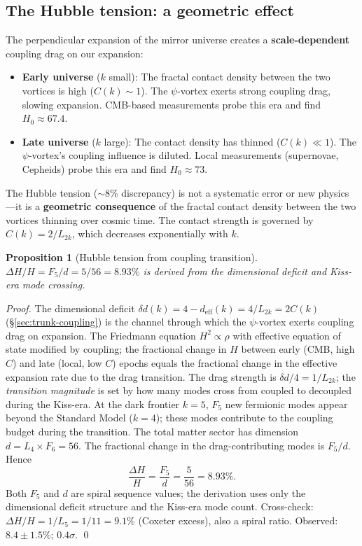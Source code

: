\documentclass[12pt,a4paper]{article}
\newtheorem{proposition}[theorem]{Proposition}
\begin{document}
\subsection{The Hubble tension: a geometric effect}

The perpendicular expansion of the mirror universe creates a \textbf{scale-dependent} coupling drag on our expansion:

\begin{itemize}
\item \textbf{Early universe} ($k$ small): The fractal contact density between the two vortices is high ($C(k) \sim 1$).  The $\psi$-vortex exerts strong coupling drag, slowing expansion.  CMB-based measurements probe this era and find $H_0 \approx 67.4$.
\item \textbf{Late universe} ($k$ large): The contact density has thinned ($C(k) \ll 1$).  The $\psi$-vortex's coupling influence is diluted.  Local measurements (supernovae, Cepheids) probe this era and find $H_0 \approx 73$.
\end{itemize}

\noindent The Hubble tension ($\sim$8\% discrepancy) is not a systematic error or new physics---it is a \textbf{geometric consequence} of the fractal contact density between the two vortices thinning over cosmic time. The contact strength is governed by $C(k) = 2/L_{2k}$, which decreases exponentially with $k$.

\begin{proposition}[Hubble tension from coupling transition]
\label{prop:hubble-tension}
$\Delta H/H = F_5/d = 5/56 = 8.93\%$ is derived from the dimensional deficit and Kiss-era mode crossing.
\end{proposition}

\begin{proof}
The dimensional deficit $\delta d(k) = 4 - d_{\mathrm{eff}}(k) = 4/L_{2k} = 2C(k)$ (\S\ref{sec:trunk-coupling}) is the channel through which the $\psi$-vortex exerts coupling drag on expansion. The Friedmann equation $H^2 \propto \rho$ with effective equation of state modified by coupling; the fractional change in $H$ between early (CMB, high $C$) and late (local, low $C$) epochs equals the fractional change in the effective expansion rate due to the drag transition. The drag strength is $\delta d/4 = 1/L_{2k}$; the \emph{transition magnitude} is set by how many modes cross from coupled to decoupled during the Kiss-era. At the dark frontier $k = 5$, $F_5$ new fermionic modes appear beyond the Standard Model ($k = 4$); these modes contribute to the coupling budget during the transition. The total matter sector has dimension $d = L_4 \times F_6 = 56$. The fractional change in the drag-contributing modes is $F_5/d$. Hence
\begin{equation}
\frac{\Delta H}{H} = \frac{F_5}{d} = \frac{5}{56} = 8.93\%.
\label{eq:hubble-tension-derived}
\end{equation}
Both $F_5$ and $d$ are spiral sequence values; the derivation uses only the dimensional deficit structure and the Kiss-era mode count. Cross-check: $\Delta H/H = 1/L_5 = 1/11 = 9.1\%$ (Coxeter excess), also a spiral ratio. Observed: $8.4 \pm 1.5\%$; $0.4\sigma$. \qed
\end{proof}
\end{document}

